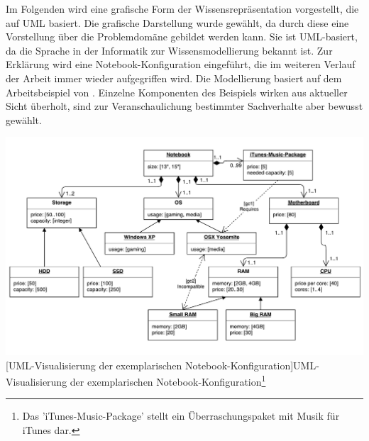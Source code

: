 \documentclass[11pt, a4paper, titlepage, listof=totoc, bibliography=totoc, index=totoc, twoside, openright, headings=normal, draft]{scrreprt}
\begin{document}
Im Folgenden wird eine grafische Form der Wissensrepräsentation vorgestellt, die auf UML basiert. Die grafische Darstellung wurde gewählt, da durch diese eine Vorstellung über die Problemdomäne gebildet werden kann. Sie ist UML-basiert, da die Sprache in der Informatik zur Wissensmodellierung bekannt ist. Zur Erklärung wird eine Notebook-Konfiguration eingeführt, die im weiteren Verlauf der Arbeit immer wieder aufgegriffen wird. Die Modellierung basiert auf dem Arbeitsbeispiel von \citep{felferning14}. Einzelne Komponenten des Beispiels wirken aus aktueller Sicht überholt, sind zur Veranschaulichung bestimmter Sachverhalte aber bewusst gewählt.

\vspace{1em}
\begin{minipage}{\linewidth}
	\centering
	\includegraphics[width=1\linewidth]{Abbildungen/notebookConfigurationUML.pdf}
	[UML-Visualisierung der exemplarischen Notebook-Konfiguration]{UML-Visualisierung der exemplarischen Notebook-Konfiguration\footnote{Das 'iTunes-Music-Package' stellt ein Überraschungspaket mit Musik für iTunes dar.}}
	\label{fig:notebookConfigurationUML}
\end{minipage}
\vspace{1em}
\end{document}
